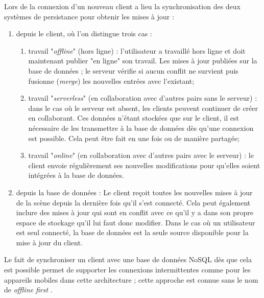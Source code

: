 Lors de la connexion d'un nouveau client a lieu la synchronisation des deux 
systèmes de persistance pour obtenir les mises à jour : 
\begin{enumerate}
	\item depuis le client, où l'on distingue trois cas :
	\begin{enumerate}
		\item travail "\textit{offline}" (hors ligne) : l'utilisateur a travaillé hors ligne et 
		doit maintenant publier "en ligne" son travail. Les mises à jour publiées sur la 
		base de données ; le serveur vérifie si aucun conflit ne survient puis 
		fusionne (\textit{merge}) les nouvelles entrées avec l'existant; 
		
		\item travail "\textit{serverless}" (en collaboration avec d'autres pairs sans le 
		serveur) : dans le cas où le serveur est absent, les clients peuvent continuer 
		de créer en collaborant. Ces données n'étant stockées que sur le client, il est 
		nécessaire de les transmettre à la base de données dès qu'une connexion 
		est possible. 
		Cela peut être fait en une fois ou de manière partagée;
		
		\item travail "\textit{online}" (en collaboration avec d'autres pairs avec le 
		serveur) : le client envoie régulièrement  ses 
		nouvelles modifications pour qu'elles soient intégrées à la base de données.
	\end{enumerate}
	\item depuis la base de données :
	Le client reçoit toutes les nouvelles mises à jour de la scène depuis la dernière 
	fois qu'il s'est connecté. Cela peut également inclure des mises à jour qui sont 
	en conflit avec ce qu'il y a dans son propre espace de stockage qu'il lui faut 
	donc modifier.
	Dans le cas où un utilisateur est seul connecté, la base de données est la 
	seule source disponible pour la mise à jour du client. 
\end{enumerate}


Le fait de synchroniser un client avec une base de données NoSQL dès que cela 
est possible permet de supporter les connexions intermittentes comme pour les 
appareils mobiles dans cette architecture ; cette approche est connue sans le nom 
de \og\textit{ offline first}\fg{} \cite{Gadea2016}.
